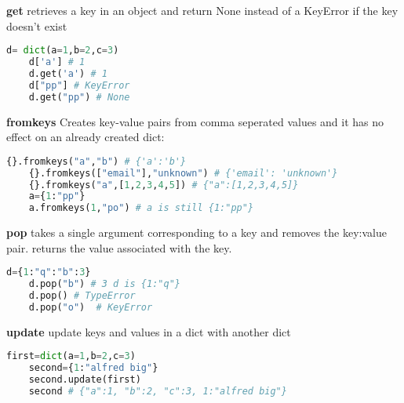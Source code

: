\documentclass[10pt]{article}
\begin{document}
\textbf{get}
retrieves a key in an object and return None instead of a KeyError if the key doesn't exist
\begin{lstlisting}[language=Python]
	d= dict(a=1,b=2,c=3)
	d['a'] # 1
	d.get('a') # 1
	d["pp"] # KeyError
	d.get("pp") # None
\end{lstlisting}
\textbf{fromkeys}
Creates key-value pairs from comma seperated values and it has no effect on an already created dict:
\begin{lstlisting}[language=Python]
	{}.fromkeys("a","b") # {'a':'b'}
	{}.fromkeys(["email"],"unknown") # {'email': 'unknown'}
	{}.fromkeys("a",[1,2,3,4,5]) # {"a":[1,2,3,4,5]}
	a={1:"pp"}
	a.fromkeys(1,"po") # a is still {1:"pp"}
\end{lstlisting}
\textbf{pop}
takes a single argument corresponding to a key and removes the key:value pair. returns the value associated with the key.
\begin{lstlisting}[language=Python]
	d={1:"q":"b":3}
	d.pop("b") # 3 d is {1:"q"}
	d.pop() # TypeError
	d.pop("o")  # KeyError
\end{lstlisting}
\textbf{update}
update keys and values in a dict with another dict
\begin{lstlisting}[language=Python]
	first=dict(a=1,b=2,c=3)
	second={1:"alfred big"}
	second.update(first)
	second # {"a":1, "b":2, "c":3, 1:"alfred big"}
\end{lstlisting}
\end{document}
